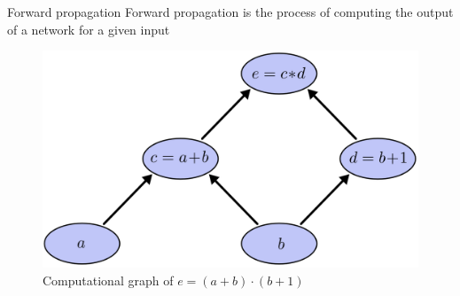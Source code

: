 \documentclass[12pt]{beamer}
\begin{document}
\begin{frame}{Forward propagation}
Forward propagation is  the process of computing the output of a network for a given input



\begin{figure}
\centering
\includegraphics[width = 0.4\linewidth]{images/backprop1.png}
\caption{Computational graph of $e = (a+b)\cdot (b+1)$}

\label{fig:propagation}
\end{figure}
\end{frame}
\end{document}

